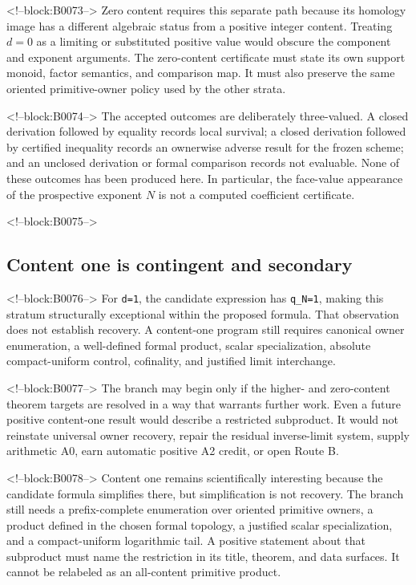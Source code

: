 \documentclass[11pt]{article}
\begin{document}
<!--block:B0073-->
Zero content requires this separate path because its homology image has
a different algebraic status from a positive integer content. Treating
$d=0$ as a limiting or substituted positive value would obscure the
component and exponent arguments. The zero-content certificate must
state its own support monoid, factor semantics, and comparison map. It
must also preserve the same oriented primitive-owner policy used by the
other strata.

<!--block:B0074-->
The accepted outcomes are deliberately three-valued. A closed
derivation followed by equality records local survival; a closed
derivation followed by certified inequality records an ownerwise
adverse result for the frozen scheme; and an unclosed derivation or
formal comparison records not evaluable. None of these outcomes has
been produced here. In particular, the face-value appearance of the
prospective exponent $N$ is not a computed coefficient certificate.

<!--block:B0075-->
\hypertarget{44-content-one-is-contingent-and-secondary}{%
\subsection{Content one is contingent and
secondary}\label{44-content-one-is-contingent-and-secondary}}

<!--block:B0076-->
For \texttt{d=1}, the candidate expression has \texttt{q\_N=1}, making
this stratum structurally exceptional within the proposed formula. That
observation does not establish recovery. A content-one program still
requires canonical owner enumeration, a well-defined formal product,
scalar specialization, absolute compact-uniform control, cofinality, and
justified limit interchange.

<!--block:B0077-->
The branch may begin only if the higher- and zero-content theorem
targets are resolved in a way that warrants further work. Even a future
positive content-one result would describe a restricted subproduct. It
would not reinstate universal owner recovery, repair the residual
inverse-limit system, supply arithmetic A0, earn automatic positive A2
credit, or open Route B.

<!--block:B0078-->
Content one remains scientifically interesting because the candidate
formula simplifies there, but simplification is not recovery. The
branch still needs a prefix-complete enumeration over oriented primitive
owners, a product defined in the chosen formal topology, a justified
scalar specialization, and a compact-uniform logarithmic tail. A
positive statement about that subproduct must name the restriction in
its title, theorem, and data surfaces. It cannot be relabeled as an
all-content primitive product.
\end{document}
